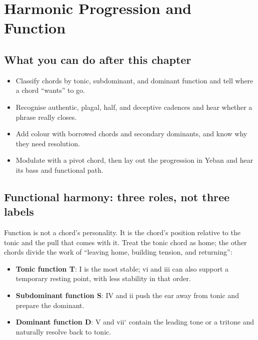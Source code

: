\clearpage
\chapter{Harmonic Progression and Function}


\label{sec:harmonic-progression}

\section*{What you can do after this chapter}
\begin{itemize}
  \item Classify chords by tonic, subdominant, and dominant function and tell where a chord ``wants'' to go.
  \item Recognise authentic, plagal, half, and deceptive cadences and hear whether a phrase really closes.
  \item Add colour with borrowed chords and secondary dominants, and know why they need resolution.
  \item Modulate with a pivot chord, then lay out the progression in Yeban and hear its bass and functional path.
\end{itemize}

\section{Functional harmony: three roles, not three labels}

Function is not a chord's personality. It is the chord's position relative to the tonic and the pull that comes with it. Treat the tonic chord as home; the other chords divide the work of ``leaving home, building tension, and returning'':

\begin{itemize}
  \item \textbf{Tonic function T}: I is the most stable; vi and iii can also support a temporary resting point, with less stability in that order.
  \item \textbf{Subdominant function S}: IV and ii push the ear away from tonic and prepare the dominant.
  \item \textbf{Dominant function D}: V and vii$^\circ$ contain the leading tone or a tritone and naturally resolve back to tonic.
\end{itemize}

